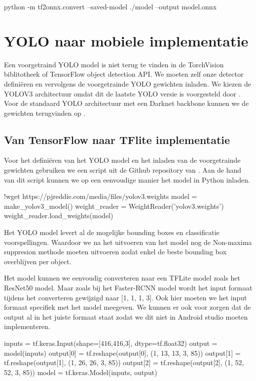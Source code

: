 \begin{python}
python -m tf2onnx.convert --saved-model ./model --output model.onnx
\end{python}

\section{YOLO naar mobiele implementatie}
Een voorgetraind YOLO model is niet terug te vinden in de TorchVision biblitotheek of TensorFlow object detection API.
We moeten zelf onze detector defini\"eren en vervolgens de voorgetrainde YOLO gewichten inladen.
We kiezen de YOLOV3 architectuur omdat dit de laatste YOLO versie is voorgesteld door \cite{redmon_yolov3_2018}.
Voor de standaard YOLO architectuur met een Darknet backbone kunnen we de gewichten terugvinden op \cite{darknet13} .

\subsection{Van TensorFlow naar TFlite implementatie}
Voor het defini\"eren van het YOLO model en het inladen van de voorgetrainde gewichten gebruiken we een script uit de Github repository van \cite{anh_yolo3_2021}.
Aan de hand van dit script kunnen we op een eenvoudige manier het model in Python inladen.

\begin{python}
!wget https://pjreddie.com/media/files/yolov3.weights
model = make_yolov3_model()
weight_reader = WeightReader('yolov3.weights')
weight_reader.load_weights(model)
\end{python}

Het YOLO model levert al de mogelijke bounding boxes en classificatie voorspellingen.
Waardoor we na het uitvoeren van het model nog de Non-maxima suppresion methode moeten uitvoeren zodat enkel de beste bounding box overblijven per object.

Het model kunnen we eenvoudig converteren naar een TFLite model zoals het ResNet50 model.
Maar zoals bij het Faster-RCNN model wordt het input formaat tijdens het converteren gewijzigd naar [1, 1, 1, 3].
Ook hier moeten we het input formaat specifiek met het model meegeven.
We kunnen er ook voor zorgen dat de output al in het juiste formaat staat zodat we dit niet in Android studio moeten implementeren.

\begin{python}
inputs = tf.keras.Input(shape=[416,416,3], dtype=tf.float32)
output = model(inputs)
output[0] =  tf.reshape(output[0], (1, 13, 13, 3, 85))
output[1] =  tf.reshape(output[1], (1, 26, 26, 3, 85))
output[2] =  tf.reshape(output[2], (1, 52, 52, 3, 85))
model = tf.keras.Model(inputs, output)
\end{python}

